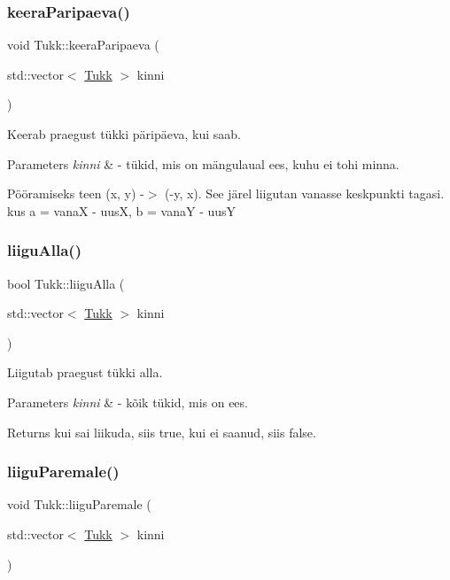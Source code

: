 \subsubsection{\texorpdfstring{keeraParipaeva()}{keeraParipaeva()}}
{\footnotesize\ttfamily void Tukk\+::keera\+Paripaeva (\begin{DoxyParamCaption}\item[{std\+::vector$<$ \mbox{\hyperlink{class_tukk}{Tukk}} $>$}]{kinni }\end{DoxyParamCaption})}

Keerab praegust tükki päripäeva, kui saab. 
\begin{DoxyParams}{Parameters}
{\em kinni} & -\/ tükid, mis on mängulaual ees, kuhu ei tohi minna. \\
\hline
\end{DoxyParams}
Pööramiseks teen (x, y) -\/$>$ (-\/y, x). See järel liigutan vanasse keskpunkti tagasi. kus a = vanaX -\/ uusX, b = vanaY -\/ uusY\mbox{\label{class_tukk_adb3c531cf6fa683e4256c8794c24de78}} 
\subsubsection{\texorpdfstring{liiguAlla()}{liiguAlla()}}
{\footnotesize\ttfamily bool Tukk\+::liigu\+Alla (\begin{DoxyParamCaption}\item[{std\+::vector$<$ \mbox{\hyperlink{class_tukk}{Tukk}} $>$}]{kinni }\end{DoxyParamCaption})}

Liigutab praegust tükki alla. 
\begin{DoxyParams}{Parameters}
{\em kinni} & -\/ kõik tükid, mis on ees. \\
\hline
\end{DoxyParams}
\begin{DoxyReturn}{Returns}
kui sai liikuda, siis true, kui ei saanud, siis false. 
\end{DoxyReturn}
\mbox{\label{class_tukk_a92d79109e3751eb5475f878c791ff241}} 
\subsubsection{\texorpdfstring{liiguParemale()}{liiguParemale()}}
{\footnotesize\ttfamily void Tukk\+::liigu\+Paremale (\begin{DoxyParamCaption}\item[{std\+::vector$<$ \mbox{\hyperlink{class_tukk}{Tukk}} $>$}]{kinni }\end{DoxyParamCaption})}

